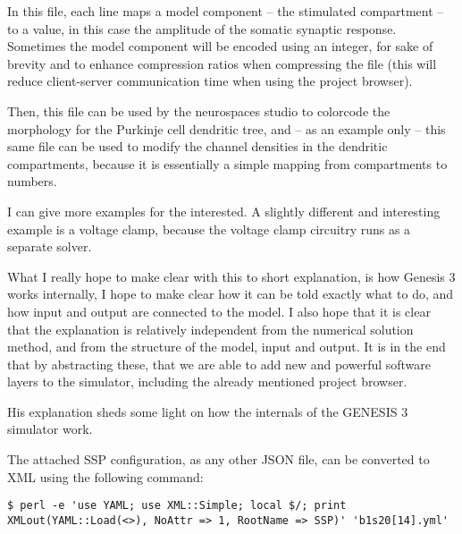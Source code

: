 \documentclass[12pt]{article}
\begin{document}
\begin{enumerate}
  In this file, each line maps a model component -- the stimulated
  compartment -- to a value, in this case the amplitude of the somatic
  synaptic response.  Sometimes the model component will be encoded
  using an integer, for sake of brevity and to enhance compression
  ratios when compressing the file (this will reduce client-server
  communication time when using the project browser).

  Then, this file can be used by the neurospaces studio to colorcode
  the morphology for the Purkinje cell dendritic tree, and -- as an
  example only -- this same file can be used to modify the channel
  densities in the dendritic compartments, because it is essentially a
  simple mapping from compartments to numbers.

  I can give more examples for the interested.  A slightly different
  and interesting example is a voltage clamp, because the voltage
  clamp circuitry runs as a separate solver.

  What I really hope to make clear with this to short explanation, is
  how Genesis 3 works internally, I hope to make clear how it can be
  told exactly what to do, and how input and output are connected to
  the model.  I also hope that it is clear that the explanation is
  relatively independent from the numerical solution method, and from
  the structure of the model, input and output.  It is in the end that
  by abstracting these, that we are able to add new and powerful
  software layers to the simulator, including the already mentioned
  project browser.
\end{enumerate}

His explanation sheds some light on how the internals of the GENESIS 3
simulator work.

The attached SSP configuration, as any other JSON file, can be
converted to XML using the following command:

\begin{verbatim}
$ perl -e 'use YAML; use XML::Simple; local $/; print
XMLout(YAML::Load(<>), NoAttr => 1, RootName => SSP)' 'b1s20[14].yml'
\end{verbatim}
\end{document}
